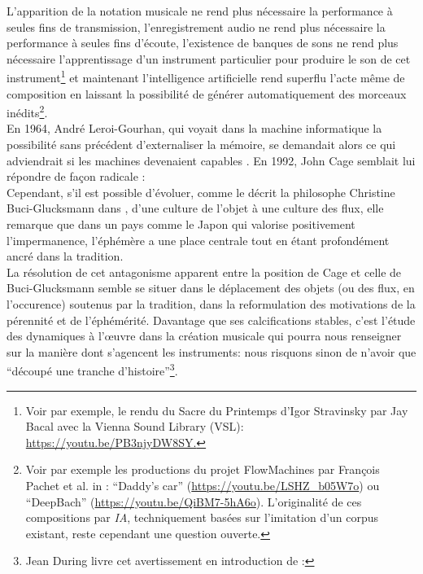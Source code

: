 \noindent L’apparition de la notation musicale ne rend plus nécessaire la performance à seules fins de transmission, l’enregistrement audio ne rend plus nécessaire la performance à seules fins d’écoute, l’existence de banques de sons ne rend plus nécessaire l’apprentissage d’un instrument particulier pour produire le son de cet instrument\footnote{\label{fn:bacal}Voir par exemple, le rendu du Sacre du Printemps d'Igor Stravinsky par Jay Bacal avec la Vienna Sound Library (VSL): \url{https://youtu.be/PB3njyDW8SY.}} et maintenant l’intelligence artificielle rend superflu l'acte même de composition en laissant la possibilité de générer automatiquement des morceaux inédits\footnote{Voir par exemple les productions du projet FlowMachines par François Pachet et al. in \cite{hadjeres_deepbach:_2016}: “Daddy's car” (\url{https://youtu.be/LSHZ_b05W7o}) ou “DeepBach” (\url{https://youtu.be/QiBM7-5hA6o}). L'originalité de ces compositions par \textit{IA}, techniquement basées sur l'imitation d'un corpus existant, reste cependant une question ouverte.}.\\
\indent En 1964, André Leroi-Gourhan, qui voyait dans la machine informatique la possibilité sans précédent d'externaliser la mémoire, se demandait alors ce qui adviendrait si les machines devenaient capables  \cite{leroi-gourhan_geste_1964}. En 1992, John Cage semblait lui répondre de façon radicale :  \cite{sebestik_ecoute_1992}\\
\indent Cependant, s'il est possible d'évoluer, comme le décrit la philosophe Christine Buci-Glucksmann dans \cite{buci-glucksmann_esthetique_2003}, d'une culture de l'objet à une culture des flux, elle remarque que dans un pays comme le Japon qui valorise positivement l'impermanence, l'éphémère a une place centrale tout en étant profondément ancré dans la tradition.\\
\indent La résolution de cet antagonisme apparent entre la position de Cage et celle de Buci-Glucksmann semble se situer dans le déplacement des objets (ou des flux, en l'occurence) soutenus par la tradition, dans la reformulation des motivations de la pérennité et de l'éphémérité. Davantage que ses calcifications stables, c'est l'étude des dynamiques à l'œuvre dans la création musicale qui pourra nous renseigner sur la manière dont s'agencent les instruments: nous risquons sinon de n'avoir que ``découpé une tranche d'histoire''\footnote{Jean During livre cet avertissement en introduction de \cite{during_quelque_1994} : }.

